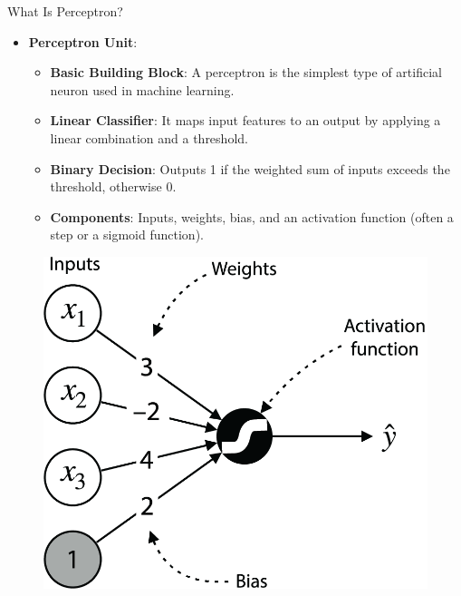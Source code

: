 \documentclass[serif, aspectratio=169]{beamer}
\begin{document}
\begin{frame}{What Is Perceptron?}
    \begin{itemize}
        \item \textbf{Perceptron Unit}:
        \medskip
        \begin{itemize}\itemsep1em
        \item \justifying \textbf{Basic Building Block}:
        A perceptron is the simplest type of artificial neuron used in machine learning.
        \item \justifying \textbf{Linear Classifier}:
        It maps input features to an output by applying a linear combination and a threshold.
        \item \justifying \textbf{Binary Decision}:
        Outputs 1 if the weighted sum of inputs exceeds the threshold, otherwise 0.
        \item \justifying \textbf{Components}:
        Inputs, weights, bias, and an activation function (often a step or a sigmoid function).
        \end{itemize}
    \end{itemize}
    \endminipage
    \hfill
    \begin{figure}
        \centering
        \includegraphics[width=\linewidth]{pic/Figure_18.png}
    \end{figure}
    \endminipage
    \vfill
\end{frame}
\end{document}
